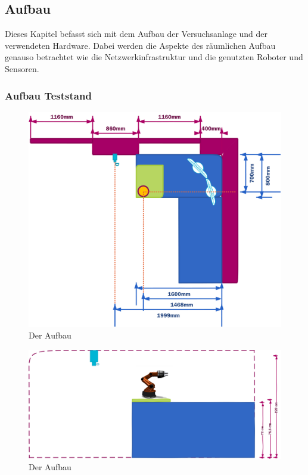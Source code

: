 \subsection{Aufbau}
\label{sec:basic-aufbau}
    
Dieses Kapitel befasst sich mit dem Aufbau der Versuchsanlage und der verwendeten Hardware. Dabei werden die Aspekte des räumlichen Aufbau genauso betrachtet wie die Netzwerkinfrastruktur und die genutzten Roboter und Sensoren.



\subsubsection{Aufbau Teststand}

 \begin{figure}[h]
 	\centering
 	\includegraphics[scale=0.8]{fig/ZeichnungRaum}   
 	\caption[Aufbau Teststand: Draufsicht]{Der Aufbau}
 	\label{fig:basic-aufbau-teststand}
 \end{figure}
 
 
  \begin{figure}[h]
  	\centering
  	\includegraphics[scale=0.5]{fig/ZeichnungRaumH}   
  	\caption[Aufbau Teststand: Draufsicht]{Der Aufbau}
  	\label{fig:basic-aufbau-teststand}
  \end{figure}
